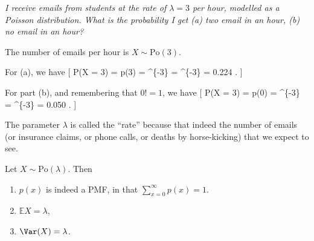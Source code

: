 \documentclass[
  letterpaper,
  DIV=11,
  numbers=noendperiod]{scrreprt}
\providecommand{\tightlist}{%
  \setlength{\itemsep}{0pt}\setlength{\parskip}{0pt}}\usepackage{longtable,booktabs,array}
\theoremstyle{remark}
\begin{document}
\emph{I receive emails from students at the rate of \(\lambda = 3\) per
hour, modelled as a Poisson distribution. What is the probability I get
(a) two email in an hour, (b) no email in an hour?}

The number of emails per hour is \(X \sim \mathrm{Po}(3)\).

For (a), we have {[} \mathbb P(X = 3) = p(3) = \^{}\{-3\}
 =  \^{}\{-3\} = 0.224 . {]}

For part (b), and remembering that \(0! = 1\), we have {[} \mathbb P(X =
3) = p(0) = \^{}\{-3\}  = \^{}\{-3\} =
0.050 . {]}

The parameter \(\lambda\) is called the ``rate'' because that indeed the
number of emails (or insurance claims, or phone calls, or deaths by
horse-kicking) that we expect to see.

Let \(X \sim \text{Po}(\lambda)\). Then

\begin{enumerate}
\def\labelenumi{\arabic{enumi}.}
\tightlist
\item
  \(p(x)\) is indeed a PMF, in that
  \(\displaystyle\sum_{x=0}^\infty p(x) = 1\).
\item
  \(\mathbb EX = \lambda\),
\item
  \(\Var(X) = \lambda\).
\end{enumerate}
\end{document}

